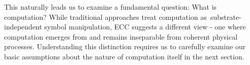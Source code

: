 This naturally leads us to examine a fundamental question: What is computation? While traditional approaches treat computation as~substrate-independent symbol manipulation, ECC suggests a different view - one where computation emerges from and remains inseparable from coherent physical processes. Understanding this distinction requires us to carefully examine our basic assumptions about the nature of computation itself in the next section.
